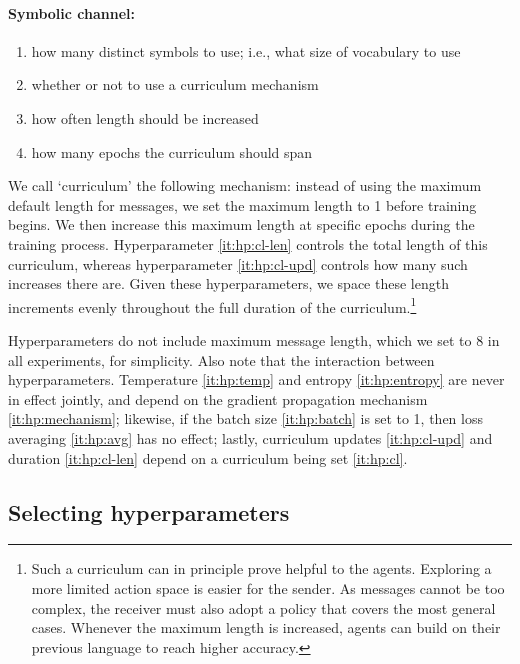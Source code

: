 \documentclass[twocolumn]{article}
\begin{document}
\paragraph{Symbolic channel:}
\begin{enumerate}[resume*]
    \vspace*{-0.5em}
    \itemsep-0.25em 
    \item how many distinct symbols to use; i.e., what size of vocabulary to use
    \item \label{it:hp:cl} whether or not to use a curriculum mechanism
    \item \label{it:hp:cl-upd} how often length should be increased
    \item \label{it:hp:cl-len} how many epochs the curriculum should span
\end{enumerate}

We call `curriculum' the following mechanism: instead of using the maximum default length for messages, we set the maximum length to 1 before training begins.
We then increase this maximum length at specific epochs during the training process.
Hyperparameter \ref{it:hp:cl-len} controls the total length of this curriculum, whereas hyperparameter \ref{it:hp:cl-upd} controls how many such increases there are.
Given these hyperparameters, we space these length increments evenly throughout the full duration of the curriculum.\footnote{
    Such a curriculum can in principle prove helpful to the agents.
    Exploring a more limited action space is easier for the sender.
    As messages cannot be too complex, the receiver must also adopt a policy that covers the most general cases.
    Whenever the maximum length is increased, agents can build on their previous language to reach higher accuracy.
}

Hyperparameters do not include maximum message length, which we set to 8 in all experiments, for simplicity.
Also note that the interaction between hyperparameters.
Temperature \ref{it:hp:temp} and entropy \ref{it:hp:entropy} are never in effect jointly, and depend on the gradient propagation mechanism \ref{it:hp:mechanism}; likewise, if the batch size \ref{it:hp:batch} is set to 1, then loss averaging \ref{it:hp:avg} has no effect; lastly, curriculum updates \ref{it:hp:cl-upd} and duration \ref{it:hp:cl-len} depend on a curriculum being set \ref{it:hp:cl}.

\subsection{Selecting hyperparameters} \label{sec:experiment:bayes-opt}
\end{document}
